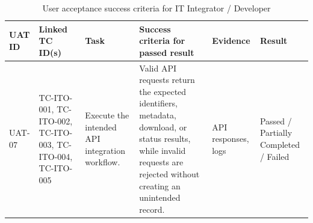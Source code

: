 \begin{table}[H]
  \centering
  \smalltable
  \scriptsize
  {%
  \setlength{\tabcolsep}{3pt}
  \renewcommand{\arraystretch}{1.18}
  \begin{tabular}{|>{\raggedright\arraybackslash}p{}|
                  >{\raggedright\arraybackslash}p{}|
                  >{\raggedright\arraybackslash}p{}|
                  >{\raggedright\arraybackslash}p{}|
                  >{\raggedright\arraybackslash}p{}|
                  >{\centering\arraybackslash}p{}|}
    \hline
    \textbf{UAT ID} &
    \textbf{Linked TC ID(s)} &
    \textbf{Task} &
    \textbf{Success criteria for passed result} &
    \textbf{Evidence} &
    \textbf{Result} \\
    \hline\hline

    UAT-07 &
    TC-ITO-001, TC-ITO-002, TC-ITO-003, TC-ITO-004, TC-ITO-005 &
    Execute the intended API integration workflow. &
    Valid API requests return the expected identifiers, metadata, download, or
    status results, while invalid requests are rejected without creating an
    unintended record. &
    API responses, logs &
    Passed / Partially Completed / Failed \\
    \hline

  \end{tabular}
  }%
  \captionsetup{type=table}
  \caption{User acceptance success criteria for IT Integrator / Developer}
  \label{tab:uat-success-integrator}
\end{table}

